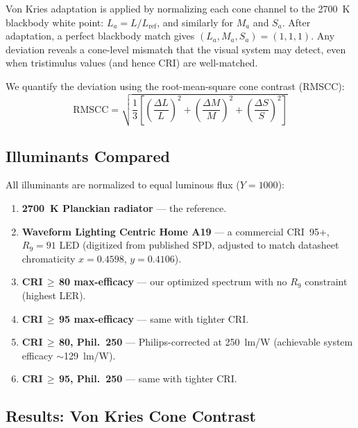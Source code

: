 \documentclass[11pt]{article}
\begin{document}
Von Kries adaptation is applied by normalizing each cone channel
to the 2700~K blackbody white point:
$L_a = L / L_{\text{ref}}$, and similarly for $M_a$ and $S_a$.
After adaptation, a perfect blackbody match gives $(L_a, M_a, S_a) = (1, 1, 1)$.
Any deviation reveals a cone-level mismatch that the visual system
may detect, even when tristimulus values (and hence CRI) are well-matched.

We quantify the deviation using the root-mean-square cone contrast
(RMSCC):
\[
\text{RMSCC} = \sqrt{\frac{1}{3}\left[
\left(\frac{\Delta L}{L}\right)^2 +
\left(\frac{\Delta M}{M}\right)^2 +
\left(\frac{\Delta S}{S}\right)^2
\right]}
\]

\subsection{Illuminants Compared}

All illuminants are normalized to equal luminous flux ($Y = 1000$):

\begin{enumerate}
\item \textbf{2700~K Planckian radiator} --- the reference.
\item \textbf{Waveform Lighting Centric Home A19} --- a commercial
  CRI~95+, $R_9 = 91$ LED (digitized from published SPD, adjusted
  to match datasheet chromaticity $x = 0.4598$, $y = 0.4106$).
\item \textbf{CRI\,$\geq$\,80 max-efficacy} --- our optimized spectrum
  with no $R_9$ constraint (highest LER).
\item \textbf{CRI\,$\geq$\,95 max-efficacy} --- same with tighter CRI.
\item \textbf{CRI\,$\geq$\,80, Phil.\ 250} --- Philips-corrected at
  250~lm/W (achievable system efficacy $\sim$129~lm/W).
\item \textbf{CRI\,$\geq$\,95, Phil.\ 250} --- same with tighter CRI.
\end{enumerate}

\subsection{Results: Von Kries Cone Contrast}
\end{document}

